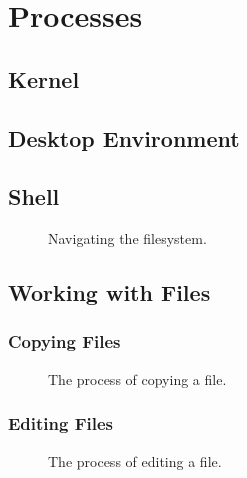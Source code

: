 \section{Processes}

\subsection{Kernel}

\subsection{Desktop Environment}

\subsection{Shell}

\begin{figure}[tbp]
  
  \caption{Navigating the filesystem.}
  \label{fig:bg:processes:navigation}
\end{figure}

\subsection{Working with Files}

\subsubsection{Copying Files}



\begin{figure}[tbp]
  
  \caption{The process of copying a file.}
  \label{fig:bg:processes:copy}
\end{figure}

\subsubsection{Editing Files}



\begin{figure}[tbp]
  
  \caption{The process of editing a file.}
  \label{fig:bg:processes:edit}
\end{figure}

